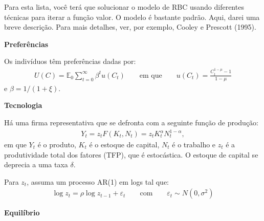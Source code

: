 \documentclass[10pt]{article}
\newcommand\E{\mathbb{E}}
\newcommand\0{\mathbf{0}}
\newcounter{exercise}
\begin{document}
\newdimen\headerwidth


\begin{center}
\end{center}

Para esta lista, você terá que solucionar o modelo de RBC usando diferentes técnicas para iterar a função valor. O modelo é bastante padrão. Aqui, darei uma breve descrição. Para mais detalhes, ver, por exemplo, Cooley e Prescott (1995).

\textbf{Preferências}

Os indivíduos têm preferências dadas por: 
\begin{align*}
U(C) = \E_0 \sum_{t=0}^\infty \beta^t u(C_t) \qquad \text{em que} \qquad 
u(C_t) = \frac{C_t^{1-\mu} - 1}{1 - \mu}
\end{align*}
e $\beta = 1/(1+\xi)$.

\textbf{Tecnologia}

Há uma firma representativa que se defronta com a seguinte função de produção:
\begin{align*}
Y_t = z_t F(K_t, N_t) = z_t K_t^\alpha N_t^{1-\alpha}, 
\end{align*}
em que $Y_t$ é o produto, $K_t$ é o estoque de capital, $N_t$ é o trabalho e $z_t$ é a produtividade total dos fatores (TFP), que é estocástica. O estoque de capital se deprecia a uma taxa $\delta$. 

Para $z_t$, assuma um processo AR(1) em logs tal que:
\begin{align*}
\log z_t = \rho \log z_{t-1} + \varepsilon_t \qquad \text{com} \qquad \varepsilon_t \sim N(0, \sigma^2)
\end{align*}\vspace{-0.8cm}

\textbf{Equilíbrio}
\end{document}
